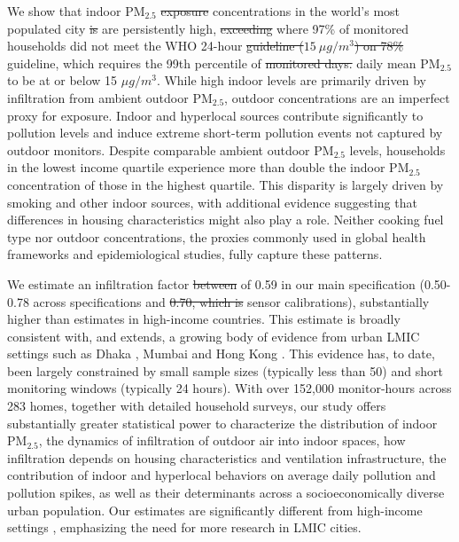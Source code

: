 \documentclass[9pt,twocolumn,twoside]{pnas-new}
\providecommand{\DIFadd}[1]{{\protect\color{red}#1}}
\providecommand{\DIFdel}[1]{{\protect\color{red}\protect\sout{#1}}}
\begin{document}
We show that indoor PM$_{2.5}$ \DIFdel{exposure} \DIFadd{concentrations} in the world's most populated city \DIFdel{is} \DIFadd{are} persistently high, \DIFdel{exceeding} \DIFadd{where 97\% of monitored households did not meet} the WHO 24-hour \DIFdel{guideline ($15~\mu g/m^3$) on 78\%} \DIFadd{guideline, which requires the 99th percentile} of \DIFdel{monitored days.} \DIFadd{daily mean PM$_{2.5}$ to be at or below 15 $\mu g/m^3$.} While high indoor levels are primarily driven by infiltration from ambient outdoor PM$_{2.5}$, outdoor concentrations are an imperfect proxy for exposure. Indoor and hyperlocal sources contribute significantly to pollution levels and induce extreme short-term pollution events not captured by outdoor monitors. Despite comparable ambient outdoor PM$_{2.5}$ levels, households in the lowest income quartile experience more than double the indoor PM$_{2.5}$ concentration of those in the highest quartile. This disparity is largely driven by smoking and other indoor sources, with additional evidence suggesting that differences in housing characteristics might also play a role. Neither cooking fuel type nor outdoor concentrations, the proxies commonly used in global health frameworks and epidemiological studies, fully capture these patterns.

We estimate an infiltration factor \DIFdel{between} \DIFadd{of} 0.59 \DIFadd{in our main specification (0.50-0.78 across specifications} and \DIFdel{0.70, which is} \DIFadd{sensor calibrations),} substantially higher than estimates in high-income countries.
This estimate is broadly consistent with, and extends, a growing body of evidence from urban LMIC settings such as Dhaka \citep{Sahaetal2025}, Mumbai \citep{Anandetal2022} and Hong Kong \citep{Hossainetal2021}. This evidence has, to date, been largely constrained by small sample sizes (typically less than 50) and short monitoring windows (typically 24 hours). 
With over 152,000 monitor-hours across 283 homes, together with detailed household surveys, our study offers substantially greater statistical power to characterize the distribution of indoor PM$_{2.5}$, the dynamics of infiltration of outdoor air into indoor spaces, how infiltration depends on housing characteristics and ventilation infrastructure, the contribution of indoor and hyperlocal behaviors on average daily pollution and pollution spikes, as well as their determinants across a socioeconomically diverse urban population. Our estimates are significantly different from high-income settings \citep{krebs_using_2021, lunderberg_assessing_2023, burke_exposures_2022}, emphasizing the need for more research in LMIC cities.
\end{document}
